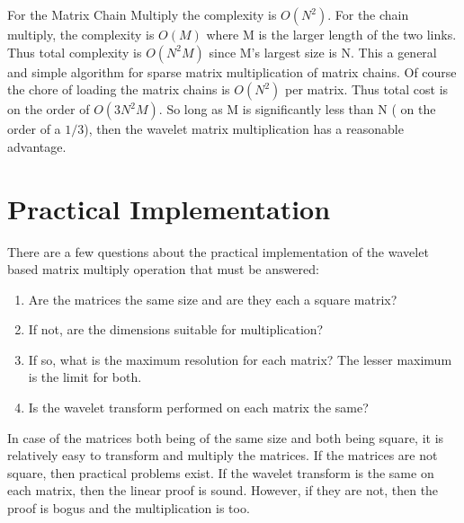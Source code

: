 For the Matrix Chain Multiply the complexity is $O(N^2)$.  For the chain multiply, the complexity is $O(M)$ where M is the larger length of the two links.  Thus total complexity is $O(N^2 M)$ since M's largest size is N.  This a general and simple algorithm for sparse matrix multiplication of matrix chains.  Of course the chore of loading the matrix chains is $O(N^2)$ per matrix.  Thus total cost is on the order of $O(3N^2 M)$.  So long as M is significantly less than N ( on the order of a $1 / 3$), then the wavelet matrix multiplication has a reasonable advantage.  

\section{Practical Implementation}

There are a few questions about the practical implementation of the wavelet based matrix multiply operation that must be answered:
\begin{enumerate}\item Are the matrices the same size and are they each a square matrix?
\item If not, are the dimensions suitable for multiplication?
\item If so, what is the maximum resolution for each matrix?  The lesser maximum is the limit for both.
\item Is the wavelet transform performed on each matrix the same?\end{enumerate}


In case of the matrices both being of the same size and both being square, %
it is relatively easy to transform and multiply the matrices.%
  If the matrices are not square, then practical problems exist.  If the wavelet transform is the same on each matrix, then the linear proof is sound.  However, if they are not, then the proof is bogus and the multiplication is too.  

